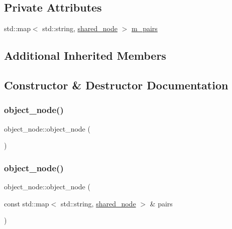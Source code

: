 \subsection*{Private Attributes}
\begin{DoxyCompactItemize}
\item 
std\+::map$<$ std\+::string, \hyperlink{namespacejawe_a3f307481d921b6cbb50cc8511fc2b544}{shared\+\_\+node} $>$ \hyperlink{classjawe_1_1object__node_ae2e895d47d9fcc39e68543b191455559}{m\+\_\+pairs}
\end{DoxyCompactItemize}
\subsection*{Additional Inherited Members}


\subsection{Constructor \& Destructor Documentation}
\mbox{\label{classjawe_1_1object__node_ad2341ef1866ed3364fe84d5099695ce6}} 
\subsubsection{\texorpdfstring{object\+\_\+node()}{object\_node()}\hspace{0.1cm}{\footnotesize\ttfamily [1/2]}}
{\footnotesize\ttfamily object\+\_\+node\+::object\+\_\+node (\begin{DoxyParamCaption}{ }\end{DoxyParamCaption})}

\mbox{\label{classjawe_1_1object__node_ada482c770ae9c4c336deab82a0ac129d}} 
\subsubsection{\texorpdfstring{object\+\_\+node()}{object\_node()}\hspace{0.1cm}{\footnotesize\ttfamily [2/2]}}
{\footnotesize\ttfamily object\+\_\+node\+::object\+\_\+node (\begin{DoxyParamCaption}\item[{const std\+::map$<$ std\+::string, \hyperlink{namespacejawe_a3f307481d921b6cbb50cc8511fc2b544}{shared\+\_\+node} $>$ \&}]{pairs }\end{DoxyParamCaption})}



